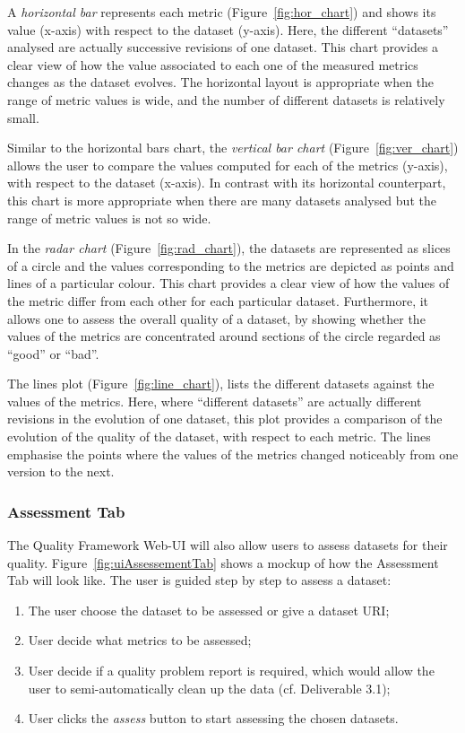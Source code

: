 A \emph{horizontal bar} represents each metric (Figure~\ref{fig:hor_chart}) and shows its value (x-axis) with respect to the dataset (y-axis).
Here, the different “datasets” analysed are actually successive revisions of one dataset.
This chart provides a clear view of how the value associated to each one of the measured metrics changes as the dataset evolves.
The horizontal layout is appropriate when the range of metric values is wide, and the number of different datasets is relatively small.

Similar to the horizontal bars chart, the \emph{vertical bar chart} (Figure~\ref{fig:ver_chart}) allows the user to compare the values computed for each of the metrics (y-axis), with respect to the dataset (x-axis).
In contrast with its horizontal counterpart, this chart is more appropriate when there are many datasets analysed but the range of metric values is not so wide.

In the \emph{radar chart} (Figure~\ref{fig:rad_chart}), the datasets are represented as slices of a circle and the values corresponding to the metrics are depicted as points and lines of a particular colour.
This chart provides a clear view of how the values of the metric differ from each other for each particular dataset. 
Furthermore, it allows one to assess the overall quality of a dataset, by showing whether the values of the metrics are concentrated around sections of the circle regarded as “good” or “bad”.

The lines plot (Figure~\ref{fig:line_chart}), lists the different datasets against the values of the metrics.
Here, where “different datasets” are actually different revisions in the evolution of one dataset, this plot provides a comparison of the evolution of the quality of the dataset, with respect to each metric.
The lines emphasise the points where the values of the metrics changed noticeably from one version to the next.


\subsubsection{Assessment Tab}
The Quality Framework Web-UI will also allow users to assess datasets for their quality.
Figure~\ref{fig:uiAssessementTab} shows a mockup of how the Assessment Tab will look like.
The user is guided step by step to assess a dataset:
\begin{enumerate}
\item The user choose the dataset to be assessed or give a dataset URI;
\item User decide what metrics to be assessed;
\item User decide if a quality problem report is required, which would allow the user to semi-automatically clean up the data (cf. Deliverable 3.1);
\item User clicks the \emph{assess} button to start assessing the chosen datasets.
\end{enumerate}


